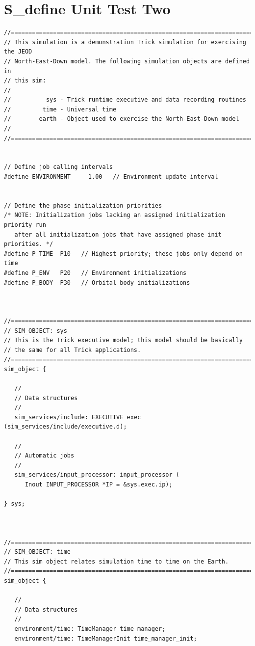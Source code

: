 \documentclass[twoside,11pt,titlepage]{report}
\begin{document}
\chapter{S\_define Unit Test Two}\label{ap3:s2}
\begin{verbatim}
//==============================================================================
// This simulation is a demonstration Trick simulation for exercising the JEOD
// North-East-Down model. The following simulation objects are defined in
// this sim:
//
//          sys - Trick runtime executive and data recording routines
//         time - Universal time
//        earth - Object used to exercise the North-East-Down model
//
//==============================================================================


// Define job calling intervals
#define ENVIRONMENT     1.00   // Environment update interval


// Define the phase initialization priorities
/* NOTE: Initialization jobs lacking an assigned initialization priority run
   after all initialization jobs that have assigned phase init priorities. */
#define P_TIME  P10   // Highest priority; these jobs only depend on time
#define P_ENV   P20   // Environment initializations
#define P_BODY  P30   // Orbital body initializations



//==============================================================================
// SIM_OBJECT: sys
// This is the Trick executive model; this model should be basically
// the same for all Trick applications.
//==============================================================================
sim_object {

   //
   // Data structures
   //
   sim_services/include: EXECUTIVE exec (sim_services/include/executive.d);

   //
   // Automatic jobs
   //
   sim_services/input_processor: input_processor (
      Inout INPUT_PROCESSOR *IP = &sys.exec.ip);

} sys;



//==============================================================================
// SIM_OBJECT: time
// This sim object relates simulation time to time on the Earth.
//==============================================================================
sim_object {

   //
   // Data structures
   //
   environment/time: TimeManager time_manager;
   environment/time: TimeManagerInit time_manager_init;


\end{verbatim}
\end{document}
